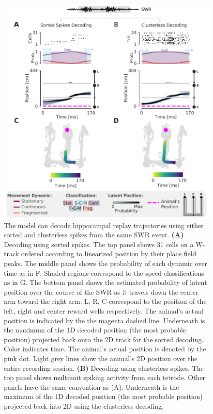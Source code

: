 \documentclass[9pt,lineno]{elife}
\begin{document}
\begin{figure}
\includegraphics[width=1.0\linewidth]{figures/Figure2/Figure2_v5}
\caption{The model can decode hippocampal replay trajectories using either sorted and clusterless spikes from the same SWR event. \textbf{(A)} Decoding using sorted spikes. The top panel shows 31 cells on a W-track ordered according to linearized position by their place field peaks. The middle panel shows the probability of each dynamic over time as in F. Shaded regions correspond to the speed classifications as in G. The bottom panel shows the estimated probability of latent position over the course of the SWR as it travels down the center arm toward the right arm. L, R, C correspond to the position of the left, right and center reward wells respectively. The animal's actual position is indicated by the the magenta dashed line. Underneath is the maximum of the 1D decoded position (the most probable position) projected back onto the 2D track for the sorted decoding. Color indicates time. The animal's actual position is denoted by the pink dot. Light grey lines show the animal's 2D position over the entire recording session. \textbf{(B)} Decoding using clusterless spikes. The top panel shows multiunit spiking activity from each tetrode. Other panels have the same convention as (A). Underneath is the maximum of the 1D decoded position (the most probable position) projected back into 2D using the clusterless decoding.
}
\label{fig:2}


\end{figure}
\end{document}

